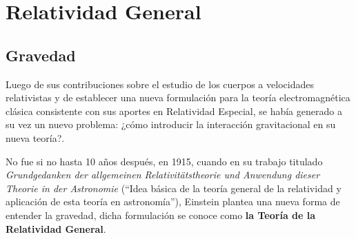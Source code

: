 \chapter{Relatividad General}
\label{cap:2}
\newpage

\section{Gravedad}

Luego de sus contribuciones sobre el estudio de los cuerpos a velocidades relativistas y de establecer una nueva formulación para la teoría electromagnética clásica consistente con sus aportes en Relatividad Especial, se había generado a su vez un nuevo problema: ¿cómo introducir la interacción gravitacional en su nueva teoría?.

No fue si no hasta 10 años después, en 1915, cuando en su trabajo titulado \textit{Grundgedanken der allgemeinen Relativitätstheorie und Anwendung dieser Theorie in der Astronomie} \cite{Einstein-2} (``Idea básica de la teoría general de la relatividad y aplicación de esta teoría en astronomía''), Einstein plantea una nueva forma de entender la gravedad, dicha formulación se conoce como \textbf{la Teoría de la Relatividad General}. 

